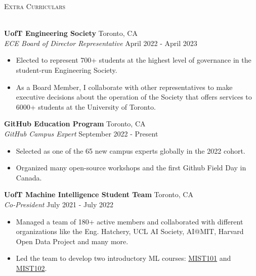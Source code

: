 \documentclass[a4paper]{article}
\newcommand{\lineunder} {
    \vspace*{-8pt} \\
    \hspace*{-18pt} \hrulefill \\
}
\newcommand{\header} [1] {
    {\hspace*{-18pt}\vspace*{6pt} \textsc{#1}}
    \vspace*{-6pt} \lineunder
}
\begin{document}
\header{Extra Curriculars}
\vspace{1mm}

\textbf{UofT Engineering Society} \hfill Toronto, CA\\
\textit{ECE Board of Director Representative} \hfill April 2022 - April 2023\\
\vspace{-1mm}
\begin{itemize} \itemsep 0.5pt
	\item Elected to represent 700+ students at the highest level of governance in the student-run Engineering Society.
	\item As a Board Member, I collaborate with other representatives to make executive decisions about the operation of the Society that offers services to 6000+ students at the University of Toronto.
\end{itemize}

\textbf{GitHub Education Program} \hfill Toronto, CA\\
\textit{GitHub Campus Expert} \hfill September 2022 - Present\\
\vspace{-1mm}
\begin{itemize} \itemsep 0.5pt
	\item Selected as one of the 65 new campus experts globally in the 2022 cohort.
    \item Organized many open-source workshops and the first Github Field Day in Canada.
\end{itemize}

\textbf{UofT Machine Intelligence Student Team} \hfill Toronto, CA\\
\textit{Co-President} \hfill July 2021 - July 2022\\
\vspace{-1mm}
\begin{itemize} \itemsep 0.5pt
	\item Managed a team of 180+ active members and collaborated with different organizations like the Eng. Hatchery, UCL AI Society, AI@MIT, Harvard Open Data Project and many more.
    \item Led the team to develop two introductory ML courses: \href{https://youtu.be/jhoN9TPSSFw}{MIST101} and \href{https://youtu.be/j76CeiJanKw}{MIST102}.
\end{itemize}
\end{document}
